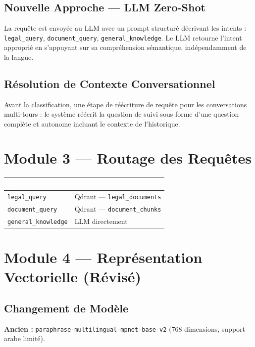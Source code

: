\documentclass[11pt,a4paper]{article}
\begin{document}
\subsection{Nouvelle Approche --- LLM Zero-Shot}

La requête est envoyée au LLM avec un prompt structuré décrivant les intents : \texttt{legal\_query}, \texttt{document\_query}, \texttt{general\_knowledge}. Le LLM retourne l'intent approprié en s'appuyant sur sa compréhension sémantique, indépendamment de la langue.

\subsection{Résolution de Contexte Conversationnel}

Avant la classification, une étape de réécriture de requête pour les conversations multi-tours : le système réécrit la question de suivi sous forme d'une question complète et autonome incluant le contexte de l'historique.

\section{Module 3 --- Routage des Requêtes}

\begin{center}
\begin{tabular}{ll}
\toprule
\rowcolor{tableheader}\textcolor{white}{\textbf{Intent}} & \textcolor{white}{\textbf{Source}} \\
\midrule
\texttt{legal\_query} & Qdrant --- \texttt{legal\_documents} \\
\texttt{document\_query} & Qdrant --- \texttt{document\_chunks} \\
\texttt{general\_knowledge} & LLM directement \\
\bottomrule
\end{tabular}
\end{center}

\section{Module 4 --- Représentation Vectorielle (Révisé)}

\subsection{Changement de Modèle}

\textbf{Ancien :} \texttt{paraphrase-multilingual-mpnet-base-v2} (768 dimensions, support arabe limité).
\end{document}
